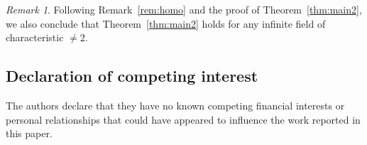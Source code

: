 \documentclass[11pt]{amsart}
\theoremstyle{definition}
\theoremstyle{remark}
\newtheorem{remark}[theorem]{Remark}
\begin{document}
\begin{remark}
    Following Remark~\ref{rem:homo} and the proof of Theorem~\ref{thm:main2}, we also conclude that Theorem~\ref{thm:main2}  holds for any infinite field of characteristic $\ne 2$. 
\end{remark}

\subsection*{Declaration of competing interest}

The authors declare that they have no known competing financial interests or personal relationships that could have appeared to influence the work reported in this paper.


\end{document}
